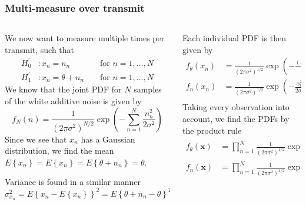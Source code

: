 \documentclass[compress,aspectratio=169]{beamer}
\newcommand{\E}[1]{\ensuremath{E\left\{#1\right\}}}
\begin{document}
\begin{frame} %
    \frametitle{Multi-measure over transmit}
    \begin{columns}
        \begin{column}{0.6\textwidth}
            We now want to measure multiple times per transmit, such that 
            \begin{alignat*}{2}
                H_{0}^{'} &: x_n = n_n &&\text{ for } n=1,\dots,N \\
                H_{1}^{'} &: x_n = \theta + n_n &&\text{ for } n=1,\dots,N
            \end{alignat*}
            We know that the joint PDF for $N$ samples of the white additive noise is
            given by 
            \begin{equation*}
                f_N\left(n\right) = \frac{1}{\left(2\pi\sigma^2\right)^{N/2}}\exp{\left(
                        -\sum^{N}_{n=1}{\frac{n_n^2}{2\sigma^2}}
                \right) }
            \end{equation*}
            Since we see that $x_n$ has a Gaussian distribution, we find the mean
            $\E{x_n} = \E{x_n} = \E{\theta+n_n}=\theta$.

            Variance is found in a similar manner
            $\sigma_{x_n}^2=\E{x_n - \E{x_n}}^2 = \E{\theta + n_n - \theta}^2 =
            \E{n_n}^2=\sigma^2$
        \end{column}
        \begin{column}{0.4\textwidth}
            Each individual PDF is then given by
            \begin{align*}
                f_\theta(x_n) &= \frac{1}{\left(2\pi\sigma^2\right)^{1/2}}\exp\left(-\frac{\left(x_n - \theta\right)^2 }{2\sigma^2}\right) \\
                f_n(x_n) &= \frac{1}{\left(2\pi\sigma^2\right)^{1/2}}\exp\left(-\frac{x_n^2 }{2\sigma^2}\right) \\
            \end{align*}
            Taking every observation into account, we find the PDFs by the product rule
            \begin{align*}
                f_\theta(\textbf{x}) &= \prod^{N}_{n=1} \frac{1}{\left(2\pi\sigma^2\right)^{1/2}}\exp\left(-\frac{\left(x_n - \theta\right)^2 }{2\sigma^2}\right) \\
                f_n(\textbf{x}) &= \prod^{N}_{n=1} \frac{1}{\left(2\pi\sigma^2\right)^{1/2}}\exp\left(-\frac{x_n^2 }{2\sigma^2}\right) \\
            \end{align*}
        \end{column}
    \end{columns}
\end{frame} %
\end{document}
